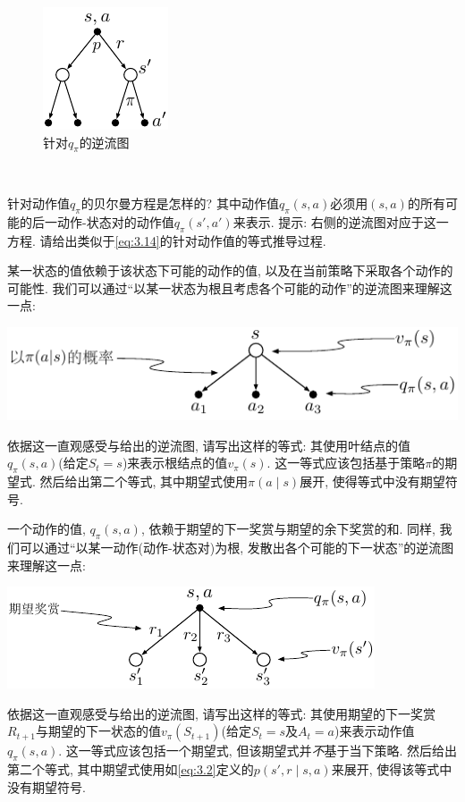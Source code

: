 \begin{figure}
\centering
\vspace{-0.7em}
\includegraphics[width=.16\textwidth]{c3/img/action_value_backup_diagram.pdf}\\
{\tiny 针对$q_{\pi}$的逆流图}
\end{figure}
\mbox{}~
\begin{exer}
针对动作值$q_{\pi}$的贝尔曼方程是怎样的? 其中动作值$q_{\pi}(s, a)$必须用$(s, a)$的所有可能的后一动作-状态对的动作值$q_{\pi}(s', a')$来表示. 提示: 右侧的逆流图对应于这一方程. 请给出类似于\eqref{eq:3.14}的针对动作值的等式推导过程.
\end{exer}

\begin{exer}
某一状态的值依赖于该状态下可能的动作的值, 以及在当前策略下采取各个动作的可能性. 我们可以通过``以某一状态为根且考虑各个可能的动作''的逆流图来理解这一点:
\begin{center}
\includegraphics[width=.6\textwidth]{c3/img/state_value_ito_action_value.pdf}
\end{center}
依据这一直观感受与给出的逆流图, 请写出这样的等式: 其使用叶结点的值$q_{\pi}(s, a)$(给定$S_t = s$)来表示根结点的值$v_{\pi}(s)$. 这一等式应该包括基于策略$\pi$的期望式. 然后给出第二个等式, 其中期望式使用$\pi(a \mid s)$展开, 使得等式中没有期望符号.
\end{exer}

\begin{exer}
一个动作的值, $q_{\pi}(s, a)$, 依赖于期望的下一奖赏与期望的余下奖赏的和. 同样, 我们可以通过``以某一动作(动作-状态对)为根, 发散出各个可能的下一状态''的逆流图来理解这一点:
\begin{center}
\includegraphics[width=.45\textwidth]{c3/img/action_value_ito_state_value.pdf}
\end{center}
依据这一直观感受与给出的逆流图, 请写出这样的等式: 其使用期望的下一奖赏$R_{t + 1}$与期望的下一状态的值$v_{\pi}(S_{t + 1})$(给定$S_t = s$及$A_t = a$)来表示动作值$q_{\pi}(s, a)$. 这一等式应该包括一个期望式, 但该期望式并\emph{不}基于当下策略. 然后给出第二个等式, 其中期望式使用如\eqref{eq:3.2}定义的$p(s', r \mid s, a)$来展开, 使得该等式中没有期望符号.
\end{exer}

